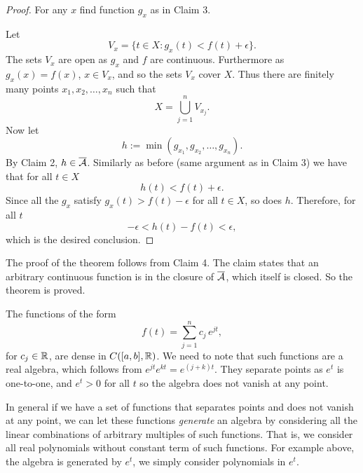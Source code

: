 \begin{proof}
For any $x$ find function $g_x$ as in Claim 3.

Let
\begin{equation*}
V_x = \bigl\{ t \in X : g_x(t) < f(t) + \epsilon \bigr\}.
\end{equation*}
The sets $V_x$ are open as $g_x$ and $f$ are continuous.
Furthermore as $g_x(x) = f(x)$, $x \in V_x$, and so the sets $V_x$ cover $X$.  Thus
there
are finitely many points $x_1,x_2,\ldots,x_n$ such that
\begin{equation*}
X = \bigcup_{j=1}^n V_{x_j} .
\end{equation*}
Now let
\begin{equation*}
h := \min(g_{x_1},g_{x_2},\ldots,g_{x_n}) .
\end{equation*}
By Claim 2, $h \in \overline{{\mathcal{A}}}$.  Similarly as before (same argument as in
Claim 3) we have that for all
$t \in X$
\begin{equation*}
h(t) < f(t) + \epsilon .
\end{equation*}
Since all the $g_x$ satisfy $g_x(t) > f(t) - \epsilon$ for all $t \in X$, so does $h$.
Therefore, for all $t$
\begin{equation*}
-\epsilon < h(t) - f(t) < \epsilon ,
\end{equation*}
which is the desired conclusion.
\end{proof}

The proof of the theorem follows from Claim 4.  The claim states that an
arbitrary continuous function is in the closure of $\overline{{\mathcal{A}}}$,
which itself is
closed.  So the theorem is proved.

\begin{example}
The functions of the form
\begin{equation*}
f(t) = \sum_{j=1}^n c_j \, e^{jt},
\end{equation*}
for $c_j \in {\mathbb{R}}$,
are dense in $C([a,b],{\mathbb{R}})$.  We need to note that such functions are a real
algebra, which follows from $e^{jt} e^{kt} = e^{(j+k)t}$.  They separate
points as $e^t$ is one-to-one, and $e^t > 0$ for all $t$ so the algebra
does not vanish at any point.
\end{example}

In general if we have a set of functions that separates points and does
not vanish at any point, we can let these functions
\emph{generate}
an algebra
by considering all the linear combinations of arbitrary multiples of such
functions.  That is, we consider all real polynomials without constant term
of such functions.  For example above,
the algebra is generated by $e^t$, we simply
consider polynomials in $e^t$.

